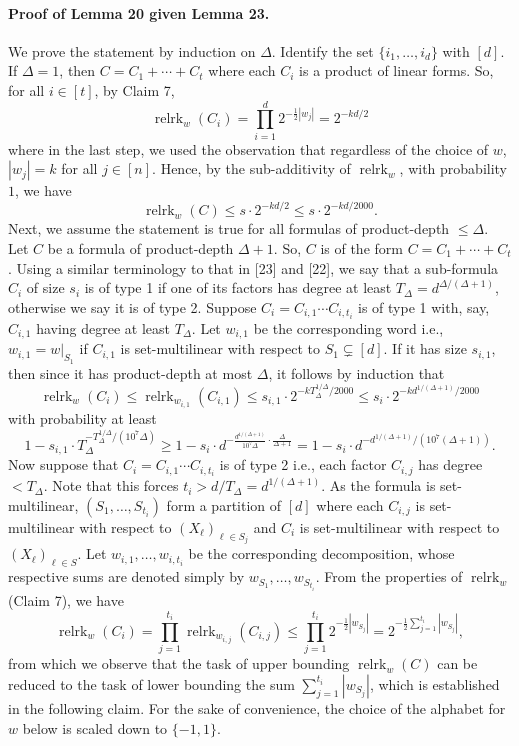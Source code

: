 \documentclass[10pt,a4paper]{article}
\begin{document}
\paragraph{Proof of Lemma 20 given Lemma 23.} We prove the statement by induction on $\Delta$. Identify the set $\{i_1,\ldots,i_d\}$ with $[d]$.
If $\Delta=1$, then $C=C_1+\cdots+C_t$ where each $C_i$ is a product of linear forms. So, for all $i\in[t]$, by Claim 7,
\[\operatorname{relrk}_w(C_i)=\prod_{i=1}^d2^{-\frac12|w_j|}=2^{-kd/2}\]
where in the last step, we used the observation that regardless of the choice of $w$, $|w_j|=k$ for all $j\in[n]$. Hence, by the sub-additivity of $\operatorname{relrk}_w$, with probability $1$, we have
\[\operatorname{relrk}_w(C)\leq s\cdot2^{-kd/2}\leq s\cdot2^{-kd/2000}.\]
Next, we assume the statement is true for all formulas of product-depth $\leq\Delta$. Let $C$ be a formula of product-depth $\Delta+1$. So, $C$ is of the form $C=C_1+\cdots+C_t$. Using a similar terminology to that in [23] and [22], we say that a sub-formula $C_i$ of size $s_i$ is of type 1 if one of its factors has degree at least $T_\Delta=d^{\Delta/(\Delta+1)}$, otherwise we say it is of type 2.
Suppose $C_i=C_{i,1}\cdots C_{i,t_i}$ is of type 1 with, say, $C_{i,1}$ having degree at least $T_\Delta$. Let $w_{i,1}$ be the corresponding word i.e., $w_{i,1}=w|_{S_1}$ if $C_{i,1}$ is set-multilinear with respect to $S_1\subsetneq[d]$. If it has size $s_{i,1}$, then since it has product-depth at most $\Delta$, it follows by induction that
\[\operatorname{relrk}_w(C_i)\leq\operatorname{relrk}_{w_{i,1}}(C_{i,1})\leq s_{i,1}\cdot2^{-kT_\Delta^{1/\Delta}/2000}\leq s_i\cdot2^{-kd^{1/(\Delta+1)}/2000}\]
with probability at least
\[1-s_{i,1}\cdot T_\Delta^{-T_\Delta^{1/\Delta}/(10^7\Delta)}\geq1-s_i\cdot d^{-\frac{d^{1/(\Delta+1)}}{10^7\Delta}\cdot\frac{\Delta}{\Delta+1}}=1-s_i\cdot d^{-d^{1/(\Delta+1)}/(10^7(\Delta+1))}.\]
Now suppose that $C_i=C_{i,1}\cdots C_{i,t_i}$ is of type 2 i.e., each factor $C_{i,j}$ has degree $<T_\Delta$. Note that this forces $t_i>d/T_\Delta=d^{1/(\Delta+1)}$. As the formula is set-multilinear, $(S_1,\ldots,S_{t_i})$ form a partition of $[d]$ where each $C_{i,j}$ is set-multilinear with respect to $(X_\ell)_{\ell\in S_j}$ and $C_i$ is set-multilinear with respect to $(X_\ell)_{\ell\in S}$. Let $w_{i,1},\ldots,w_{i,t_i}$ be the corresponding decomposition, whose respective sums are denoted simply by $w_{S_1},\ldots,w_{S_{t_i}}$.
From the properties of $\operatorname{relrk}_w$ (Claim 7), we have
\[\operatorname{relrk}_w(C_i)=\prod_{j=1}^{t_i}\operatorname{relrk}_{w_{i,j}}(C_{i,j})\leq\prod_{j=1}^{t_i}2^{-\frac12|w_{S_j}|}=2^{-\frac12\sum_{j=1}^{t_i}|w_{S_j}|},\]
from which we observe that the task of upper bounding $\operatorname{relrk}_w(C)$ can be reduced to the task of lower bounding the sum $\sum_{j=1}^{t_i}|w_{S_j}|$, which is established in the following claim. For the sake of convenience, the choice of the alphabet for $w$ below is scaled down to $\{-1,1\}$.
\end{document}
